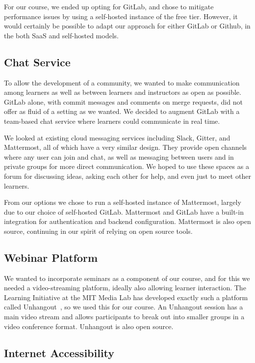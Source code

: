 \documentclass[12pt,twoside]{mitthesis}
\newcommand{\draft}[1]{{#1}}
\begin{document}
For our course, we ended up opting for GitLab, and chose to mitigate performance issues by using a self-hosted instance of the free tier. However, it would certainly be possible to adapt our approach for either GitLab or Github, in the both SaaS and self-hosted models.

\subsection{Chat Service}

To allow the development of a community, we wanted to make communication among learners as well as between learners and instructors as open as possible. GitLab alone, with commit messages and comments on merge requests, did not offer as fluid of a setting as we wanted. We decided to augment GitLab with a team-based chat service where learners could communicate in real time.

We looked at existing cloud messaging services including Slack, Gitter, and Mattermost, all of which have a very similar design. They provide open channels where any user can join and chat, as well as messaging between users and in private groups for more direct communication. We hoped to use these spaces as a forum for discussing ideas, asking each other for help, and even just to meet other learners.

From our options we chose to run a self-hosted instance of Mattermost, largely due to our choice of self-hosted GitLab. Mattermost and GitLab have a built-in integration for authentication and backend configuration. Mattermost is also open source, continuing in our spirit of relying on open source tools.

\subsection{Webinar Platform}

\draft{We wanted to incorporate seminars as a component of our course, and for this we needed a video-streaming platform, ideally also allowing learner interaction. The Learning Initiative at the MIT Media Lab has developed exactly such a platform called Unhangout~\cite{unhangout}, so we used this for our course. An Unhangout session has a main video stream and allows participants to break out into smaller groups in a video conference format. Unhangout is also open source.}

\subsection{Internet Accessibility}
\end{document}
